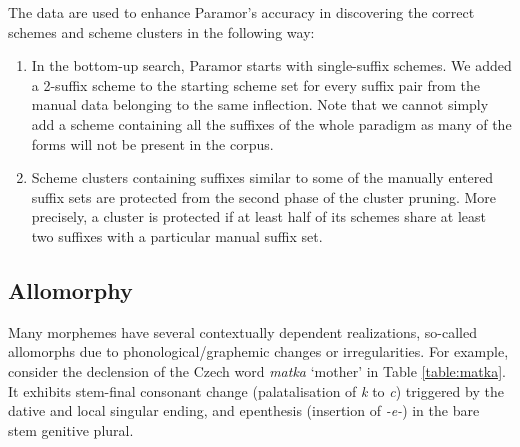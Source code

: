 \documentclass{itatnew}
\newcommand{\e}[1]{\textit{#1}} %
\newcommand{\todojd}[1]{} %
\begin{document}
\noindent
The data are used to enhance Paramor's accuracy in discovering the correct schemes and scheme clusters in the following way:
\begin{enumerate}
\item In the bottom-up search, Paramor starts with single-suffix schemes. We added a 2-suffix scheme to the starting scheme set for every suffix pair from the manual data belonging to the same inflection. Note that we cannot simply add a scheme containing all the suffixes of the whole paradigm as many of the forms will not be present in the corpus.
    
\item Scheme clusters containing suffixes similar to some of the manually entered suffix sets are protected from the second phase of the cluster pruning. More precisely, a cluster is protected if at least half of its schemes share at least two suffixes with a particular manual suffix set.
\todojd{Is there any reason why half and two, and not, say, 60\% and 3?  \textbf{RK:} Not really -- similar criterion is often used in Paramor so I used it here as well.}



\end{enumerate}



\subsection{Allomorphy}
\label{sec:allomorphy}

\noindent
Many morphemes have several contextually dependent realizations,  so-called
allomorphs due to phonological/graphemic changes or irregularities. For example, consider the declension of the Czech word \e{matka} `mother' in Table \ref{table:matka}. It exhibits stem-final conso\-nant chan\-ge (palatalisation of \e{k} to \e{c}) triggered by the dative and local singular ending, and epenthesis (insertion of \e{-e-}) in the bare stem genitive plural.
\end{document}
